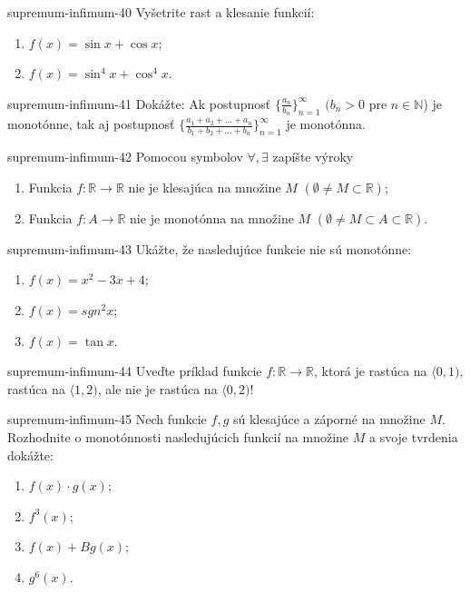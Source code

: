 \begin{defproblem}{supremum-infimum-40}
Vyšetrite rast a klesanie funkcií:
\begin{enumerate}
\item $f(x)=\sin x +\cos x$;
\item $f(x)=\sin^4 x +\cos^4 x$.
\end{enumerate}
\end{defproblem}

\begin{defproblem}{supremum-infimum-41}
Dokážte: Ak postupnosť $\{\frac{a_n}{b_n}\}_{n=1}^\infty$ $(b_n>0$ pre $n\in\mathbb{N}$) je monotónne, tak aj postupnosť $\{\frac{a_1+a_2+...+a_n}{b_1+b_2+...+b_n}\}_{n=1}^\infty$ je monotónna.
\end{defproblem}

\begin{defproblem}{supremum-infimum-42}
Pomocou symbolov $\forall,\exists$ zapíšte výroky
\begin{enumerate}
\item Funkcia $f:\mathbb{R}\rightarrow\mathbb{R}$ nie je klesajúca na množine $M$ $(\emptyset \neq M\subset\mathbb{R})$;
\item Funkcia $f:A \rightarrow\mathbb{R}$ nie je monotónna na množine $M$ $(\emptyset \neq M\subset A \subset\mathbb{R})$.
\end{enumerate}
\end{defproblem}

\begin{defproblem}{supremum-infimum-43}
Ukážte, že nasledujúce funkcie nie sú monotónne:
\begin{enumerate}
\item $f(x)=x^2-3x+4$;
\item $f(x)=sgn^2 x$;
\item $f(x)=\tan x$.
\end{enumerate}
\end{defproblem}

\begin{defproblem}{supremum-infimum-44}
Uveďte príklad funkcie $f:\mathbb{R}\rightarrow\mathbb{R}$, ktorá je rastúca na $\langle 0,1)$, rastúca na $\langle 1,2)$, ale nie je rastúca na $\langle 0,2)$!
\end{defproblem}

\begin{defproblem}{supremum-infimum-45}
Nech funkcie $f,g$ sú klesajúce a záporné na množine $M$. Rozhodnite o monotónnosti nasledujúcich funkcií na množine $M$ a svoje tvrdenia dokážte:
\begin{multicols}{2}
\begin{enumerate}
    \item $f(x)\cdot g(x)$;
    \item $f^3(x)$;
    \item $f(x)+Bg(x)$;
    \item $g^6(x)$.
\end{enumerate}
\end{multicols}
\end{defproblem}


